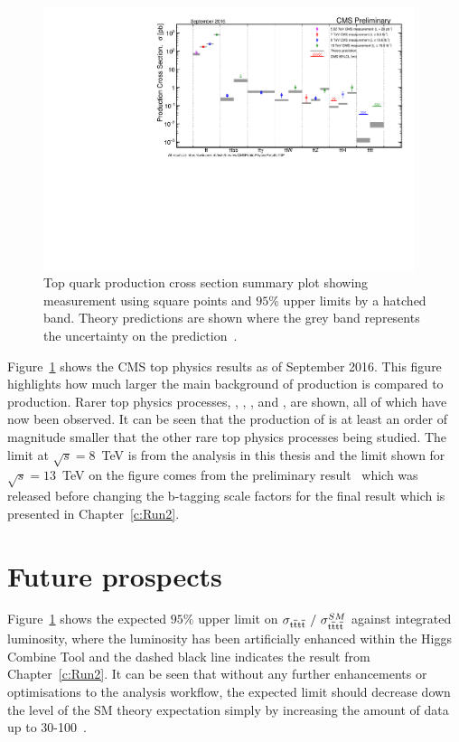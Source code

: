 \begin{figure}[ht!]
\begin{center}
    \includegraphics[width=0.97\textwidth]{images/Conclusion/ttplusx_staircase.pdf}
    \caption{Top quark production cross section summary plot showing measurement using square points and $95\%$ upper limits by a hatched band. Theory predictions are shown where the grey band represents the uncertainty on the prediction~\cite{topSumTwiki}.}
    \label{fig:ttbarXstairway}
\end{center}
\end{figure}

Figure~\ref{fig:ttbarXstairway} shows the CMS top physics results as of September 2016. This figure highlights how much larger the main background of \ttbar production is compared to \tttt production.
Rarer top physics processes, \ttbb, \ttgam, \ttW, \ttZ and \ttH, are shown, all of which have now been observed. It can be seen that the production of \tttt is at least an order of magnitude smaller that the other rare top physics processes being studied. The limit at $\sqrt{s}=8$~TeV is from the analysis in this thesis and the limit shown for $\sqrt{s}=13$~TeV on the figure comes from the preliminary result~\cite{CMS-PAS-TOP-16-016} which was released before changing the b-tagging scale factors for the final result which is presented in Chapter~\ref{c:Run2}.

\section{Future prospects}

Figure~\ref{fig:ttbarXstairway} shows the expected $95\%$ upper limit on $\sigma_{{\mathrm{t}\overline{\mathrm{t}}\mathrm{t}\overline{\mathrm{t}}}}~/~\sigma_{{\mathrm{t}\overline{\mathrm{t}}\mathrm{t}\overline{\mathrm{t}}}}^{SM} $ against integrated luminosity, where the luminosity has been artificially enhanced within the Higgs Combine Tool and the dashed black line indicates the \runtwo result from Chapter~\ref{c:Run2}. It can be seen that without any further enhancements or optimisations to the analysis workflow, the expected limit should decrease down the level of the SM theory expectation simply by increasing the amount of data up to 30-100~\fbinv.

